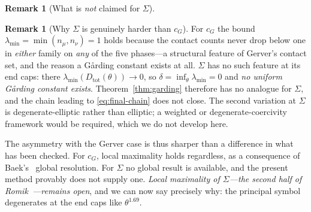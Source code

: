 \documentclass[11pt]{amsart}
\theoremstyle{plain}
\theoremstyle{definition}
\newtheorem{remark}[theorem]{Remark}
\newcommand{\cG}{c_{G}}
\begin{document}
\begin{remark}[What is \emph{not} claimed for $\Sigma$]
\begin{remark}[Why $\Sigma$ is genuinely harder than $\cG$]
\label{rem:sigma-harder}
For $\cG$ the bound $\lambda_{\min}=\min(n_{\mu},n_{\nu})=1$ holds
because the contact counts never drop below one in \emph{either}
family on \emph{any} of the five phases---a structural feature of
Gerver's contact set, and the reason a G\aa rding constant exists at
all.  $\Sigma$ has no such feature at its end caps: there
$\lambda_{\min}(D_{\mathrm{tot}}(\theta))\to0$, so
$\delta = \inf_{\theta}\lambda_{\min} = 0$ and
\emph{no uniform G\aa rding constant exists}.  Theorem~\ref{thm:garding}
therefore has no analogue for $\Sigma$, and the chain leading to
\eqref{eq:final-chain} does not close.  The second variation at
$\Sigma$ is degenerate-elliptic rather than elliptic; a weighted or
degenerate-coercivity framework would be required, which we do not
develop here.
\end{remark}

The asymmetry with the Gerver case is thus sharper than a difference
in what has been checked.  For $\cG$, local maximality holds
regardless, as a consequence of Baek's~\cite{Baek2024} global
resolution.  For $\Sigma$ no global result is available, and the
present method provably does not supply one.  \emph{Local maximality
of $\Sigma$---the second half of
Romik~\cite[\S7, Open Problem~1]{Romik2018}---remains open}, and we
can now say precisely why: the principal symbol degenerates at the
end caps like $\theta^{1.69}$.
\end{remark}
\end{document}
